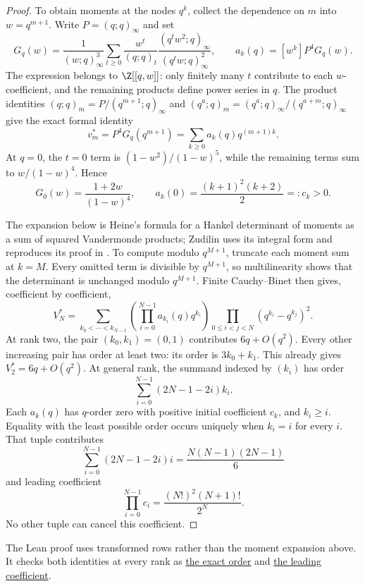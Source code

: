 \documentclass[11pt]{article}
\begin{document}
\begin{proof}
To obtain moments at the nodes $q^k$, collect the dependence on $m$ into
$w=q^{m+1}$. Write $P=(q;q)_\infty$ and set
\[
 G_q(w)=\frac1{(w;q)_\infty^3}
 \sum_{t\ge0}\frac{w^t}{(q;q)_t}
       \frac{(q^tw^2;q)_\infty}{(q^tw;q)_\infty^2},
 \qquad a_k(q)=[w^k]P^4G_q(w).
\]
The expression belongs to $\Z[[q,w]]$: only finitely many $t$
contribute to each $w$-coefficient, and the remaining products define
power series in $q$. The product identities
$(q;q)_m=P/(q^{m+1};q)_\infty$ and
$(q^a;q)_m=(q^a;q)_\infty/(q^{a+m};q)_\infty$
give the exact formal identity
\[
 v_m^*=P^4G_q(q^{m+1})
      =\sum_{k\ge0}a_k(q)q^{(m+1)k}.
\]
At $q=0$, the $t=0$ term is $(1-w^2)/(1-w)^5$, while the remaining
terms sum to $w/(1-w)^4$. Hence
\[
 G_0(w)=\frac{1+2w}{(1-w)^4},\qquad
 a_k(0)=\frac{(k+1)^2(k+2)}2=:c_k>0.
\]

The expansion below is Heine's formula for a Hankel determinant of moments as
a sum of squared Vandermonde products; Zudilin uses its integral form and
reproduces its proof in \cite[Sec.~2, (2)--(5), pp.~2--3]{zudilin2017det}.
To compute modulo $q^{M+1}$, truncate each moment sum at $k=M$.
Every omitted term is divisible by $q^{M+1}$, so multilinearity shows
that the determinant is unchanged modulo $q^{M+1}$. Finite
Cauchy--Binet then gives, coefficient by coefficient,
\[
 V_N^*=\sum_{k_0<\cdots<k_{N-1}}
 \left(\prod_{i=0}^{N-1}a_{k_i}(q)q^{k_i}\right)
 \prod_{0\le i<j<N}(q^{k_i}-q^{k_j})^2.
\]
At rank two, the pair $(k_0,k_1)=(0,1)$ contributes
$6q+O(q^2)$. Every other increasing pair has order at least two:
its order is $3k_0+k_1$. This already gives $V_2^*=6q+O(q^2)$.
At general rank, the summand indexed by $(k_i)$ has order
\[
 \sum_{i=0}^{N-1}(2N-1-2i)k_i.
\]
Each $a_k(q)$ has $q$-order zero with positive initial coefficient $c_k$,
and $k_i\ge i$.  Equality with the least possible
order occurs uniquely when $k_i=i$ for every $i$.  That tuple contributes
\[
 \sum_{i=0}^{N-1}(2N-1-2i)i=\frac{N(N-1)(2N-1)}6
\]
and leading coefficient
\[
 \prod_{i=0}^{N-1}c_i=\frac{(N!)^2(N+1)!}{2^N}.
\]
No other tuple can cancel this coefficient.
\end{proof}

\noindent The Lean proof uses transformed rows rather than the
moment expansion above. It checks both identities at every rank as
\href{https://github.com/wcook04/plectis-erdos/blob/0b500c7cf8e8bb7ae343484378df02f277fb8194/lean/ErdosProblems/Erdos1049/AllRow/Producer.lean#L173}{the exact order} and
\href{https://github.com/wcook04/plectis-erdos/blob/0b500c7cf8e8bb7ae343484378df02f277fb8194/lean/ErdosProblems/Erdos1049/AllRow/Producer.lean#L199}{the leading coefficient}.
\end{document}
